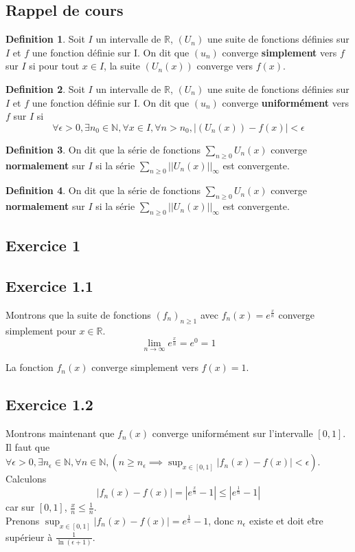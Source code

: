 \documentclass[]{book}
\theoremstyle{definition}
\newtheorem{defn}{Definition}
\newcommand{\bb}[1]{\mathbb{#1}}
\newcommand{\R}{\bb{R}}
\newcommand{\N}{\bb{N}}
\begin{document}
\subsection*{Rappel de cours}
\begin{defn}
Soit $I$ un intervalle de $\R$,  $(U_n)$ une suite de fonctions d\'efinies sur $I$ et $f$ une fonction d\'efinie sur I.
On dit que $(u_n)$ converge \textbf{simplement} vers $f$ sur $I$ si pour tout $x \in I$, la suite $(U_n(x))$ converge vers $f(x)$.
\end{defn}

\begin{defn}
Soit $I$ un intervalle de $\R$,  $(U_n)$ une suite de fonctions d\'efinies sur $I$ et $f$ une fonction d\'efinie sur I.
On dit que $(u_n)$ converge \textbf{uniform\'ement} vers $f$ sur $I$ si
$$\forall \epsilon > 0, \exists n_0 \in \N, \forall x \in I, \forall n > n_0, |(U_n(x)) - f(x)| < \epsilon$$
\end{defn}

\begin{defn}
On dit que la s\'erie de fonctions $\sum_{n\geq0}U_n(x)$ converge \textbf{normalement} sur  $I$ si la s\'erie $\sum_{n\geq0}||U_n(x)||_{\infty}$ est convergente.
 \end{defn}

\begin{defn}
On dit que la s\'erie de fonctions $\sum_{n\geq0}U_n(x)$ converge \textbf{normalement} sur  $I$ si la s\'erie $\sum_{n\geq0}||U_n(x)||_{\infty}$ est convergente.
\end{defn}


\newpage
\subsection*{Exercice 1}
\subsection*{Exercice 1.1}
Montrons que la suite de fonctions $(f_n)_{n \ge 1}$ avec $f_n(x)=e^{\frac{x}{n}}$ converge simplement pour $x \in \R$.
$$\lim_{n \to \infty}e^{\frac{x}{n}} = e^{0} = 1$$

La fonction $f_n(x)$ converge simplement vers $f(x) = 1$. 

\subsection*{Exercice 1.2}
Montrons maintenant que $f_n(x)$ converge uniform\'ement sur l'intervalle $[0,1]$. Il faut que $\forall \epsilon > 0, \exists n_{\epsilon} \in \N, \forall n \in \N, (n \geq n_{\epsilon} \implies \sup_{x \in [0,1]} |f_n(x)-f(x)| < \epsilon)$.
Calculons 
$$|f_n(x)-f(x)| = \left|e^{\frac{x}{n}} -1 \right| \leq \left|e^{\frac{1}{n}} -1 \right|$$
car sur $[0,1]$, $\frac{x}{n} \leq \frac{1}{n}$. \\ 
Prenons $\sup_{x \in [0,1]} |f_n(x)-f(x)| = e^{\frac{1}{n}}-1$, donc $n_{\epsilon}$ existe et doit e\^tre sup\'erieur \`a $\frac{1}{\ln(\epsilon+1)}$.
\end{document}

